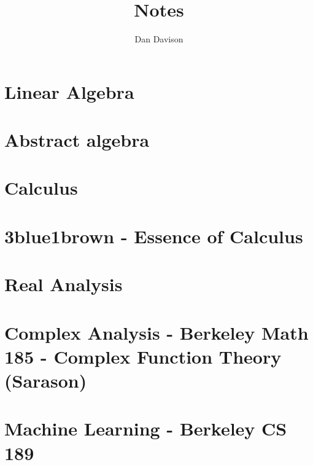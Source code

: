 \documentclass{book}
\title{Notes}
\author{Dan Davison}
\begin{document}
\frontmatter
\maketitle
\tableofcontents
\mainmatter

\chapter{Linear Algebra}


\chapter{Abstract algebra}


\chapter{Calculus}


\chapter{3blue1brown - Essence of Calculus}


\chapter{Real Analysis}


\chapter{Complex Analysis - Berkeley Math 185 - Complex Function Theory (Sarason)}


\chapter{Machine Learning - Berkeley CS 189}


\end{document}
